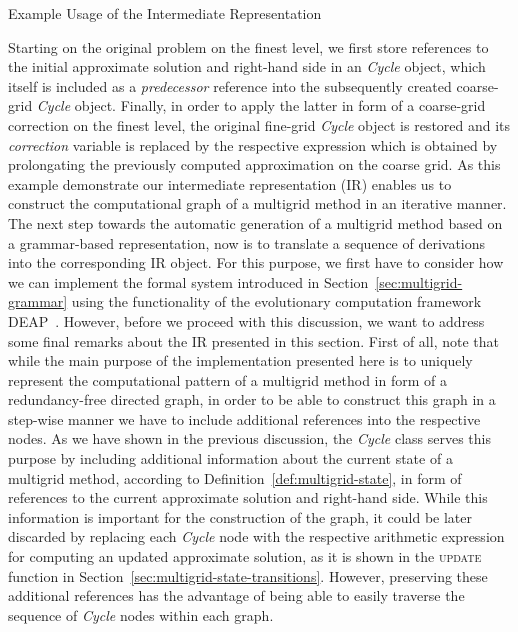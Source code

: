 \begin{listing}
	\inputminted{python}{evostencils/ir/example.py}
	\caption{Example Usage of the Intermediate Representation}
	\label{code:ir:example.py}
\end{listing}
Starting on the original problem on the finest level, we first store references to the initial approximate solution and right-hand side in an \emph{Cycle} object, which itself is included as a \emph{predecessor} reference into the subsequently created coarse-grid \emph{Cycle} object.
Finally, in order to apply the latter in form of a coarse-grid correction on the finest level, the original fine-grid \emph{Cycle} object is restored and its \emph{correction} variable is replaced by the respective expression which is obtained by prolongating the previously computed approximation on the coarse grid.
As this example demonstrate our intermediate representation (IR) enables us to construct the computational graph of a multigrid method in an iterative manner.
The next step towards the automatic generation of a multigrid method based on a grammar-based representation, now is to translate a sequence of derivations into the corresponding IR object.
For this purpose, we first have to consider how we can implement the formal system introduced in Section~\ref{sec:multigrid-grammar} using the functionality of the evolutionary computation framework DEAP~\cite{rainville2012deap}.
However, before we proceed with this discussion, we want to address some final remarks about the IR presented in this section.
First of all, note that while the main purpose of the implementation presented here is to uniquely represent the computational pattern of a multigrid method in form of a redundancy-free directed graph, in order to be able to construct this graph in a step-wise manner we have to include additional references into the respective nodes.
As we have shown in the previous discussion, the \emph{Cycle} class serves this purpose by including additional information about the current state of a multigrid method, according to Definition~\ref{def:multigrid-state}, in form of references to the current approximate solution and right-hand side.
While this information is important for the construction of the graph, it could be later discarded by replacing each \emph{Cycle} node with the respective arithmetic expression for computing an updated approximate solution, as it is shown in the \textsc{update} function in Section~\ref{sec:multigrid-state-transitions}.
However, preserving these additional references has the advantage of being able to easily traverse the sequence of \emph{Cycle} nodes within each graph.
